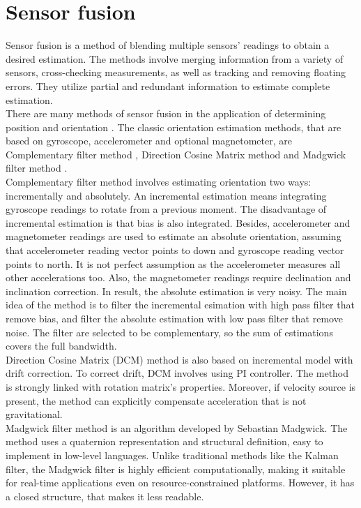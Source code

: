 \chapter{Sensor fusion}

Sensor fusion is a method of blending multiple sensors’ readings to obtain a desired estimation. The methods involve merging information from a variety of sensors, cross-checking measurements, as well as tracking and removing floating errors. They utilize partial and redundant information to estimate complete estimation.\\

There are many methods of sensor fusion in the application of determining position and orientation \cite{uav}. The classic orientation estimation methods, that are based on gyroscope, accelerometer and optional magnetometer, are Complementary filter method \cite{complementary}, Direction Cosine Matrix method \cite{dcm} and Madgwick filter method \cite{madgwick}. \\

Complementary filter method involves estimating orientation two ways: incrementally and absolutely. An incremental estimation means integrating gyroscope readings to rotate from a previous moment. The disadvantage of incremental estimation is that bias is also integrated. Besides, accelerometer and magnetometer readings are used to estimate an absolute orientation, assuming that accelerometer reading vector points to down and gyroscope reading vector points to north. It is not perfect assumption as the accelerometer measures all other accelerations too. Also, the magnetometer readings require declination and inclination correction. In result, the absolute estimation is very noisy. The main idea of the method is to filter the incremental esimation with high pass filter that remove bias, and filter the absolute estimation with low pass filter that remove noise. The filter are selected to be complementary, so the sum of estimations covers the full bandwidth.\\

Direction Cosine Matrix (DCM) method is also based on incremental model with drift correction.
To correct drift, DCM involves using PI controller. The method is strongly linked with rotation matrix's properties. Moreover, if velocity source is present, the method can explicitly compensate acceleration that is not gravitational. \\

Madgwick filter method is an algorithm developed by Sebastian Madgwick. The method uses a quaternion representation and structural definition, easy to implement in low-level languages. Unlike traditional methods like the Kalman filter, the Madgwick filter is highly efficient computationally, making it suitable for real-time applications even on resource-constrained platforms. However, it has a closed structure, that makes it less readable. \cite{madgwick2}\\

